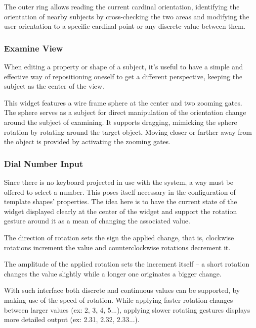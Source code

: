 The outer ring allows reading the current cardinal orientation,
identifying the orientation of nearby subjects by cross-checking the two areas and
modifying the user orientation to a specific cardinal point or any discrete value between them.


\subsubsection{Examine View}

When editing a property or shape of a subject, it's useful to have a simple and effective way
of repositioning oneself to get a different perspective, keeping the subject as the center of the view.


This widget features a wire frame sphere at the center and two zooming gates.
The sphere serves as a subject for direct manipulation of the orientation change around the subject of examining.
It supports dragging, mimicking the sphere rotation by rotating around the target object.
Moving closer or farther away from the object is provided by activating the zooming gates.


\subsubsection{Dial Number Input}

Since there is no keyboard projected in use with the system, a way must be offered to select a number.
This poses itself necessary in the configuration of template shapes' properties.
The idea here is to have the current state of the widget displayed clearly at the center of the widget
and support the rotation gesture around it as a mean of changing the associated value.


The direction of rotation sets the sign the applied change, that is, clockwise rotations increment
the value and counterclockwise rotations decrement it.

The amplitude of the applied rotation sets the increment itself -- a short rotation changes the value
slightly while a longer one originates a bigger change.

With such interface both discrete and continuous values can be supported, by making use of the speed of rotation.
While applying faster rotation changes between larger values (ex: 2, 3, 4, 5...), applying slower rotating
gestures displays more detailed output (ex: 2.31, 2.32, 2.33...).

